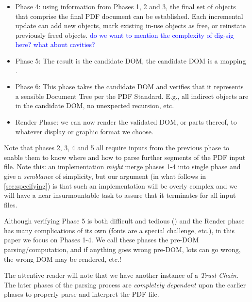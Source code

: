 \begin{itemize}
\item Phase 4: using information from Phases 1, 2 and 3, the final set of objects that comprise the final PDF document can be established. Each incremental update can add new objects, mark existing in-use objects as free, or reinstate previously freed objects. \textcolor{blue}{do we want to mention the complexity of dig-sig here? what about cavities?} 
\item Phase 5:  The result is the candidate DOM, 
  the candidate DOM is a mapping .
\item Phase 6: This phase takes the candidate DOM and verifies that
  it represents a sensible Document Tree per the PDF Standard.  E.g.,
  all indirect objects are in the candidate DOM, no unexpected recursion,
  etc.
\item Render Phase: we can now render the validated DOM, or parts thereof, to
  whatever display or graphic format we choose.
\end{itemize}

Note that phases 2, 3, 4 and 5
all require inputs from the previous phase to enable them to know where and
how to parse further segments of the PDF input file.
%
Note this: an implementation \emph{might} merge phases 1-4 into single phase
and give a \emph{semblance} of simplicity, but our argument (in what
follows in \cref{sec:specifying}) is that such an implementation will be
overly complex and we will have a near insurmountable task to assure that it
terminates for all input files.


Although verifying Phase 5 is both difficult and tedious
()
and the Render phase has many complications of its own (fonts are
a special challenge, etc.), in this paper we focus on Phases 1-4.
We call these phases the pre-DOM parsing/computation, and if anything
goes wrong pre-DOM, lots can go wrong, the wrong DOM may be rendered, etc.!


The attentive reader will note that we have another instance of a \emph{Trust
Chain}.  The later phases of the parsing process are \emph{completely
dependent} upon the earlier phases to properly parse and interpret the PDF
file.

